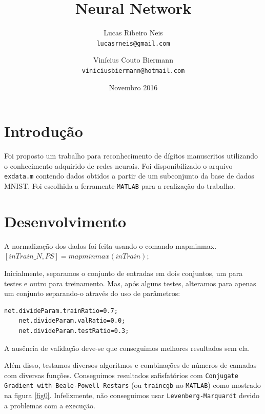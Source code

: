\documentclass{article}
\begin{document}
\title{\textbf{Neural Network}}
\author{
    Lucas Ribeiro Neis\\
     {\texttt{lucasrneis@gmail.com}}
     \and
     Vinícius Couto Biermann\\
      {\texttt{viniciusbiermann@hotmail.com}}
      \vspace{-50mm}
}
\date{Novembro 2016}

\maketitle

\section{Introdução}
Foi proposto um trabalho para reconhecimento de dígitos manuscritos utilizando o conhecimento adquirido de redes neurais. Foi disponibilizado o arquivo \texttt{exdata.m} contendo dados obtidos a partir de um subconjunto da base de dados MNIST.
Foi escolhida a ferramente \texttt{MATLAB} para a realização do trabalho.

\section{Desenvolvimento}

A normalização dos dados foi feita usando o comando mapminmax.\\
\hspace*{2cm} $[inTrain\_N,PS]=mapminmax(inTrain);$ 
\newline

Inicialmente, separamos o conjunto de entradas em dois conjuntos, um para testes e outro para treinamento. Mas, após alguns testes, alteramos para apenas um conjunto separando-o através do uso de parâmetros:

\begin{lstlisting}[mathescape]
    net.divideParam.trainRatio=0.7;
    net.divideParam.valRatio=0.0;
    net.divideParam.testRatio=0.3;
\end{lstlisting}

A ausência de validação deve-se que conseguimos melhores resultados sem ela.

Além disso, testamos diversos algoritmos e combinações de números de camadas com diversas funções. Conseguimos resultados safisfatórios com \texttt{Conjugate Gradient with Beale-Powell Restars} (ou \texttt{traincgb} no \texttt{MATLAB}) como mostrado na figura \ref{fig0}. Infelizmente, não conseguimos usar \texttt{Levenberg-Marquardt} devido a problemas com a execução.
\end{document}
